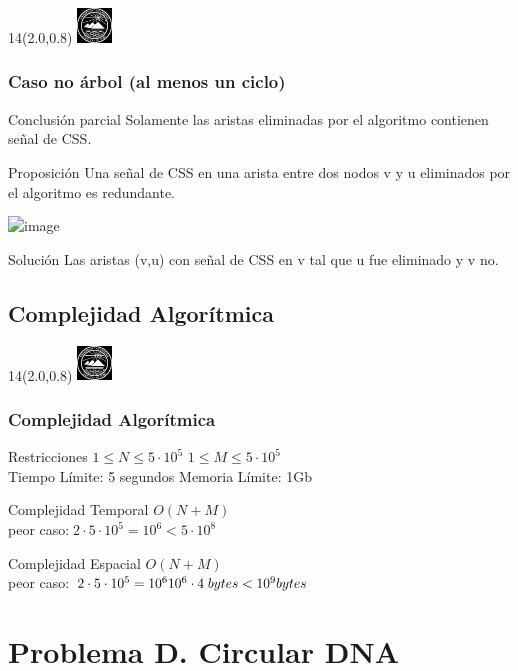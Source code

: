 \documentclass[10pt,xcolor=tables,{dvipsnames}]{beamer}
\newcommand{\MyLogo}{%
	\begin{textblock}{14}(2.0,0.8)
		\includegraphics[height=0.925cm, angle=0]{UOWhite}
	\end{textblock}
}
\begin{document}
         \begin{frame}
         	\MyLogo
         	\frametitle{Caso no árbol (al menos un ciclo)}
         	\begin{block}{Conclusión parcial}
         		Solamente las aristas eliminadas por el algoritmo contienen señal de CSS.
         	\end{block}
         	\begin{block}{Proposición}
Una señal de CSS en una arista entre dos nodos v y u eliminados por el algoritmo es redundante.
         	\end{block}
         	\includegraphics<1->[scale=0.55]{NodosEliminadosRedundantes1}
         	\begin{block}{Solución}
         		Las aristas (v,u) con señal de CSS en v tal que u fue eliminado y v no.
         	\end{block}	
         \end{frame}
         
	\subsection{Complejidad Algorítmica}
	         
	         \begin{frame}
	         	\MyLogo
	         	\frametitle{Complejidad Algorítmica}
	         	\begin{block}{Restricciones}
		         	$1 \leq N \leq 5\cdot10^5$\hspace{1cm}
		         	$1 \leq M \leq 5\cdot10^5$\\
		            Tiempo L\'imite: 5 segundos \hspace{1cm}  Memoria L\'imite: 1Gb
	         	\end{block}	
	         	\begin{block}{Complejidad Temporal}
	         		$O(N + M)$\\
	         		peor caso:$\; 2 \cdot 5\cdot 10^5 = 10^6 < 5\cdot 10^8$
	         	\end{block}
	         	\begin{block}{Complejidad Espacial}
	         		$O(N + M)$\\
	         		peor caso:$\; 2 \cdot 5\cdot 10^5 = 10^6\\ 
	         		10^6\cdot 4 \;bytes < 10^9 bytes$
	         	\end{block}
	         \end{frame}
	         
\section{Problema D. Circular DNA}
\end{document}

